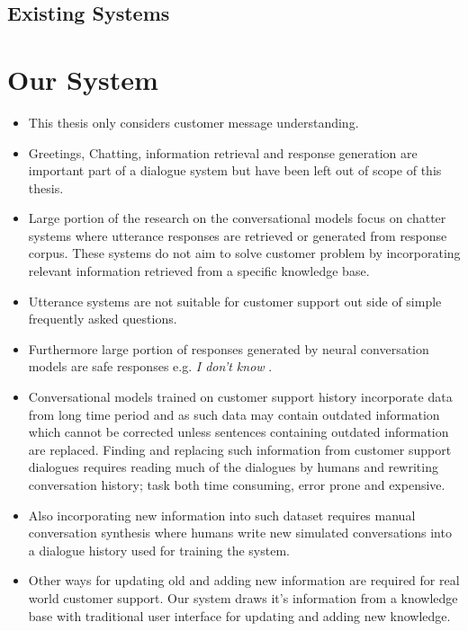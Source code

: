 \documentclass[12pt,a4paper,english
]{tutthesis}
\begin{document}
\section{Existing Systems}


\chapter{Our System}
\label{ch:our_system}
\begin{itemize}
\item This thesis only considers customer message understanding.
\item Greetings, Chatting, information retrieval and response generation are important part of a dialogue system but have been left out of scope of this thesis.
\item Large portion of the research on the conversational models focus on chatter systems where utterance responses are retrieved or generated from response corpus. These systems do not aim to solve customer problem by incorporating relevant information retrieved from a specific knowledge base.
\item Utterance systems are not suitable for customer support out side of simple frequently asked questions.
\item Furthermore large portion of responses generated by neural conversation models are safe responses e.g. \textit{I don't know} \cite{Li2015}.
\item Conversational models trained on customer support history incorporate data from long time period and as such data may contain outdated information which cannot be corrected unless sentences containing outdated information are replaced. Finding and replacing such information from customer support dialogues requires reading much of the dialogues by humans and rewriting conversation history; task both time consuming, error prone and expensive.
\item Also incorporating new information into such dataset requires manual conversation synthesis where humans write new simulated conversations into a dialogue history used for training the system.
\item Other ways for updating old and adding new information are required for real world customer support. Our system draws it's information from a knowledge base with traditional user interface for updating and adding new knowledge.
\end{itemize}
\end{document}
